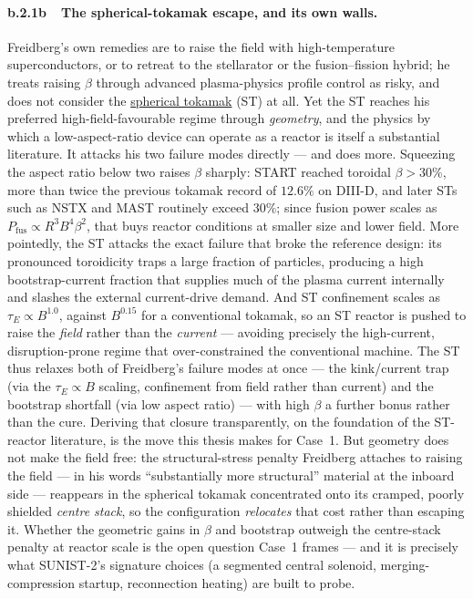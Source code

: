 \documentclass[11pt]{article}
\newcommand{\jl}[2]{\href{#2}{#1}}
\begin{document}
\paragraph{b.2.1b~~The spherical-tokamak escape, and its own walls.}
Freidberg's own remedies are to raise the field with high-temperature superconductors, or to retreat to the stellarator or the fusion--fission hybrid; he treats raising $\beta$ through advanced plasma-physics profile control as risky, and does not consider the \jl{spherical tokamak}{https://en.wikipedia.org/wiki/Spherical_tokamak} (ST) at all.\cite{freidberg2015} Yet the ST reaches his preferred high-field-favourable regime through \emph{geometry}, and the physics by which a low-aspect-ratio device can operate as a reactor is itself a substantial literature.\cite{peng1986,sykes2018,menard2016} It attacks his two failure modes directly --- and does more. Squeezing the aspect ratio below two raises $\beta$ sharply: START reached toroidal $\beta>30\%$, more than twice the previous tokamak record of $12.6\%$ on DIII-D, and later STs such as NSTX and MAST routinely exceed $30\%$; since fusion power scales as $P_{\mathrm{fus}}\propto R^{3}B^{4}\beta^{2}$, that buys reactor conditions at smaller size and lower field.\cite{sykes1997,tan_iaea} More pointedly, the ST attacks the exact failure that broke the reference design: its pronounced toroidicity traps a large fraction of particles, producing a high bootstrap-current fraction that supplies much of the plasma current internally and slashes the external current-drive demand.\cite{tan_iaea} And ST confinement scales as $\tau_E\propto B^{1.0}$, against $B^{0.15}$ for a conventional tokamak, so an ST reactor is pushed to raise the \emph{field} rather than the \emph{current} --- avoiding precisely the high-current, disruption-prone regime that over-constrained the conventional machine.\cite{tan_iaea,mcnamara2024} The ST thus relaxes both of Freidberg's failure modes at once --- the kink/current trap (via the $\tau_E\propto B$ scaling, confinement from field rather than current) and the bootstrap shortfall (via low aspect ratio) --- with high $\beta$ a further bonus rather than the cure. Deriving that closure transparently, on the foundation of the ST-reactor literature, is the move this thesis makes for Case~1.\cite{menard2016,sykes2018,costley2019} But geometry does not make the field free: the structural-stress penalty Freidberg attaches to raising the field --- in his words ``substantially more structural'' material at the inboard side --- reappears in the spherical tokamak concentrated onto its cramped, poorly shielded \emph{centre stack}, so the configuration \emph{relocates} that cost rather than escaping it. Whether the geometric gains in $\beta$ and bootstrap outweigh the centre-stack penalty at reactor scale is the open question Case~1 frames --- and it is precisely what SUNIST-2's signature choices (a segmented central solenoid, merging-compression startup, reconnection heating) are built to probe.\cite{tan_iaea}
\end{document}
